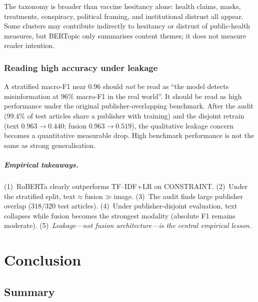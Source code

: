 \documentclass[12pt, a4paper]{report}
\begin{document}
The taxonomy is broader than vaccine hesitancy alone: health claims, masks, treatments, conspiracy, political framing, and institutional distrust all appear.
Some clusters may contribute indirectly to hesitancy or distrust of public-health measures, but BERTopic only summarises content themes; it does not measure reader intention.

\subsection{Reading high accuracy under leakage}

A stratified macro-F1 near $0.96$ should \emph{not} be read as ``the model detects misinformation at $96\%$ macro-F1 in the real world''.
It should be read as high performance under the original publisher-overlapping benchmark.
After the audit ($99.4\%$ of test articles share a publisher with training) and the disjoint retrain (text $0.963\rightarrow 0.440$; fusion $0.963\rightarrow 0.519$), the qualitative leakage concern becomes a quantitative measurable drop.
High benchmark performance is not the same as strong generalisation.

\paragraph{Empirical takeaways.}
(1)~RoBERTa clearly outperforms TF--IDF+LR on CONSTRAINT.
(2)~Under the stratified split, text$\approx$fusion$\gg$image.
(3)~The audit finds large publisher overlap ($318/320$ test articles).
(4)~Under publisher-disjoint evaluation, text collapses while fusion becomes the strongest modality (absolute F1 remains moderate).
(5)~\emph{Leakage---not fusion architecture---is the central empirical lesson.}

\chapter{Conclusion}
\label{chap:conclusion}

\section{Summary}
\label{sec:summary}
\end{document}
